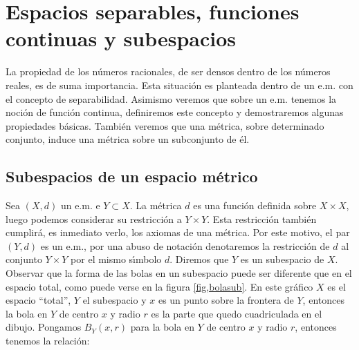 
\chapter{Espacios separables, funciones continuas y subespacios}

La propiedad de los n\'umeros racionales, de ser densos dentro de
los n\'umeros reales, es de suma importancia. Esta situaci\'on es
planteada dentro de un e.m. con el concepto de separabilidad.
Asimismo veremos que sobre un e.m. tenemos la noci\'on de
funci\'on continua, definiremos este concepto y demostraremos
algunas propiedades b\'asicas. Tambi\'en veremos que una
m\'etrica, sobre determinado conjunto, induce una m\'etrica sobre
un subconjunto de \'el.

\section{Subespacios de un espacio m\'etrico}

Sea $(X,d)$ un e.m. e $Y\subset X$. La m\'etrica $d$ es una
funci\'on definida sobre $X\times X$, luego podemos considerar su
restricci\'on a $Y\times Y$. Esta restricci\'on tambi\'en
cumplir\'a, es inmediato verlo,  los axiomas de una m\'etrica. Por
este motivo, el par $(Y,d)$ es un e.m., por una abuso de
notaci\'on denotaremos la restricci\'on de $d$ al conjunto
$Y\times Y$ por el mismo s\'{\i}mbolo $d$.  Diremos que $Y$ es un
subespacio de $X$.  Observar que la forma de las bolas en un
subespacio puede ser diferente que en el espacio total, como puede
verse en la figura \vref{fig,bolasub}. En este gr\'afico $X$ es el
espacio ``total'', $Y$ el subespacio y $x$ es un punto sobre la
frontera de $Y$, entonces la bola en $Y$ de centro $x$ y radio $r$
es la parte que quedo cuadriculada en el dibujo. Pongamos
$B_Y(x,r)$ para la bola en $Y$ de centro  $x$ y radio $r$,
entonces tenemos la relaci\'on:

